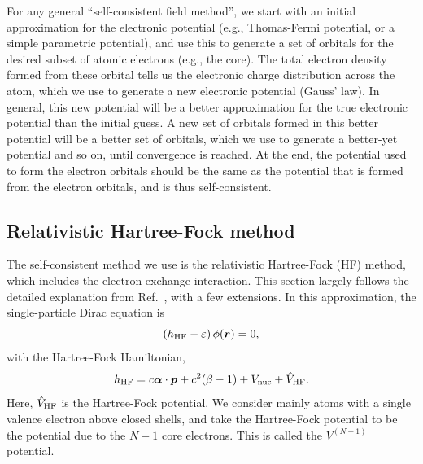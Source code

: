 \documentclass[10pt,twocolumn,a4paper]{article}%
\renewcommand{\v}[1]{\ensuremath{\boldsymbol{#1}}}		%
\newcommand{\be}{\begin{equation}}
\newcommand{\ee}{\end{equation}}
\def\en{\ensuremath{\varepsilon}}
\begin{document}
For any general ``self-consistent field method'', we start with an initial approximation for the electronic potential (e.g., Thomas-Fermi potential, or a simple parametric potential), and use this to generate a set of orbitals for the desired subset of atomic electrons (e.g., the core).
The total electron density formed from these orbital tells us the electronic charge distribution across the atom, which we use to generate a new electronic potential (Gauss' law).
In general, this new potential will be a better approximation for the true electronic potential than the initial guess.
A new set of orbitals formed in this better potential will be a better set of orbitals, which we use to generate a better-yet potential and so on, until convergence is reached.
At the end, the potential used to form the electron orbitals should be the same as the potential that is formed from the electron orbitals, and is thus self-consistent.

\subsection{Relativistic Hartree-Fock method}

The self-consistent method we use is the relativistic Hartree-Fock (HF) method, which includes the electron exchange interaction.
This section largely follows the detailed explanation from Ref.~\cite{JohnsonBook2007}, with a few extensions.
In this approximation, the single-particle Dirac equation is
\be\label{eq:HF}
\left(h_{\rm HF} - \en\right) \phi(\v{r}) = 0,
\ee
with the Hartree-Fock Hamiltonian,
\be\label{eq:H-HF}
h_{\rm HF}  = c \v{\alpha}\cdot\v{p} + c^2(\beta-1) +  V_{\rm nuc} +  \hat V_{\rm HF}.
\ee
Here, $\hat V_{\rm HF}$ is the Hartree-Fock potential.
We consider mainly atoms with a single valence electron above closed shells, and take the Hartree-Fock potential to be the potential due to the $N-1$ core electrons.
This is called the $V^{(N-1)}$ potential.
\end{document}
